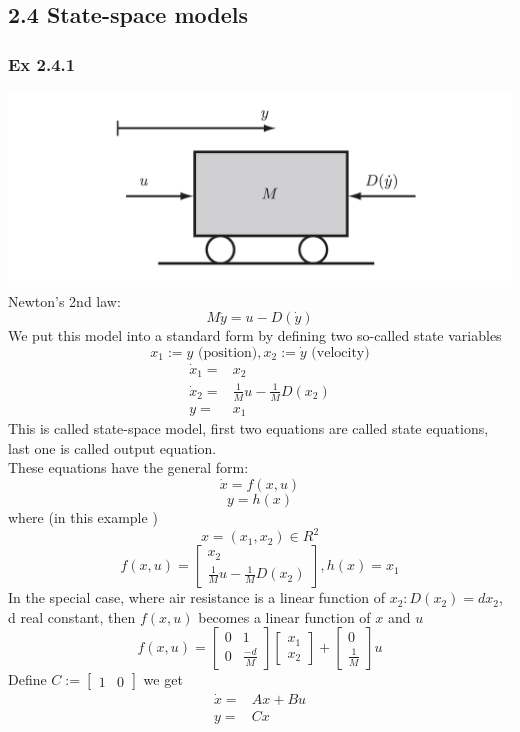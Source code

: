 \documentclass[letterpaper]{article}
\begin{document}
\subsection*{2.4 State-space models}
\subsubsection*{Ex 2.4.1}
\includegraphics[scale=0.5]{images/EX2_4_1.png}\\
Newton's 2nd law: $$M\ddot y=u-D(\dot y)$$
We put this model into a standard form by defining two so-called state variables
$$x_1:=y \text{ (position)}, x_2:=\dot y \text{ (velocity)}$$
\begin{align*}
	\dot x_1= & x_2                              \\
	\dot x_2= & \frac{1}{M}u - \frac{1}{M}D(x_2) \\
	y=        & x_1                              
\end{align*}
This is called state-space model, first two equations are called state equations, last one is called output equation.\\
These equations have the general form: $$\dot x=f(x,u)$$ $$y=h(x)$$ where (in this example ) $$x=(x_1,x_2)\in R^2$$ $$f(x,u)=\begin{bmatrix}x_2\\ \frac{1}{M}u-\frac{1}{M}D(x_2)\end{bmatrix}, h(x)=x_1$$
In the special case, where air resistance is a linear function of $x_2:D(x_2)=dx_2$, d real constant, then $f(x,u)$ becomes a linear function of $x$ and $u$
$$f(x,u)=
\begin{bmatrix} 
	0 & 1 \\0&\frac{-d}{M}
\end{bmatrix} 
\begin{bmatrix} 
	x_1 \\x_2
\end{bmatrix} +
\begin{bmatrix} 
	0 \\\frac{1}{M}
\end{bmatrix}
u$$
Define 
$C:= 
\begin{bmatrix}
	1 & 0 
\end{bmatrix}$
we get 
\begin{align*}
	\dot x= & Ax+Bu \\
	y=      & Cx    
\end{align*}
\end{document}
